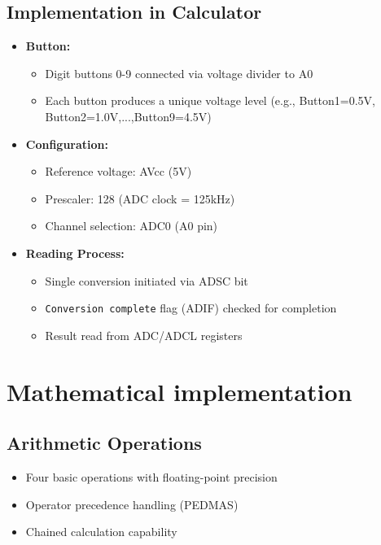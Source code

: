 \documentclass[journal]{IEEEtran}
\begin{document}
\subsection{Implementation in Calculator}
\begin{itemize}
    \item \textbf{Button:}
    \begin{itemize}
        \item Digit buttons 0-9 connected via voltage divider to A0
        \item Each button produces a unique voltage level (e.g., Button1=0.5V, Button2=1.0V,...,Button9=4.5V)
    \end{itemize}
    
    \item \textbf{Configuration:}
    \begin{itemize}
        \item Reference voltage: AVcc (5V)
        \item Prescaler: 128 (ADC clock = 125kHz)
        \item Channel selection: ADC0 (A0 pin)
    \end{itemize}

    \item \textbf{Reading Process:}
    \begin{itemize}
        \item Single conversion initiated via ADSC bit
        \item \texttt{Conversion complete} flag (ADIF) checked for completion
        \item Result read from ADC/ADCL registers
    \end{itemize}
\end{itemize}

\section{Mathematical implementation}

\subsection{Arithmetic Operations}
\begin{itemize}
    \item Four basic operations with floating-point precision
    \item Operator precedence handling (PEDMAS)
    \item Chained calculation capability 
\end{itemize}
\end{document}
